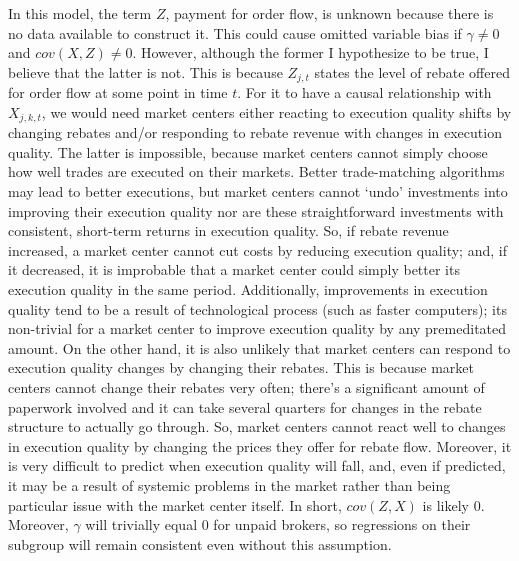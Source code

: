 \documentclass[12pt,a4paper]{extarticle}
\begin{document}
	In this model, the term $Z$, payment for order flow, is unknown because there is no data available to construct it. This could cause omitted variable bias if $\gamma \neq 0$ and $cov(X, Z) \neq 0$. However, although the former I hypothesize to be true, I believe that the latter is not. This is because $Z_{j,  t}$ states the level of rebate offered for order flow at some point in time $t$. For it to have a causal relationship with $X_{j, k,  t}$, we would need market centers either reacting to execution quality shifts by changing rebates and/or responding to rebate revenue with changes in execution quality. The latter is impossible, because market centers cannot simply choose how well trades are executed on their markets. Better trade-matching algorithms may lead to better executions, but market centers cannot `undo' investments into improving their execution quality nor are these straightforward investments with consistent, short-term returns in execution quality. So, if rebate revenue increased, a market center cannot cut costs by reducing execution quality; and, if it decreased, it is improbable that a market center could simply better its execution quality in the same period. Additionally, improvements in execution quality tend to be a result of technological process (such as faster computers); its non-trivial for a market center to improve execution quality by any premeditated amount. On the other hand, it is also unlikely that market centers can respond to execution quality changes by changing their rebates. This is because market centers cannot change their rebates very often; there's a significant amount of paperwork involved and it can take several quarters for changes in the rebate structure to actually go through. So, market centers cannot react well to changes in execution quality by changing the prices they offer for rebate flow. Moreover, it is very difficult to predict when execution quality will fall, and, even if predicted, it may be a result of systemic problems in the market rather than being particular issue with the market center itself. In short, $cov(Z, X)$ is likely $0$. Moreover, $\gamma$ will trivially equal $0$ for unpaid brokers, so regressions on their subgroup will remain consistent even without this assumption. 
	
\end{document}
